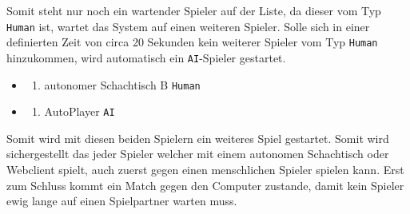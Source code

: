 Somit steht nur noch ein wartender Spieler auf der Liste, da dieser vom
Typ \passthrough{\lstinline!Human!} ist, wartet das System auf einen
weiteren Spieler. Solle sich in einer definierten Zeit von circa 20
Sekunden kein weiterer Spieler vom Typ \passthrough{\lstinline!Human!}
hinzukommen, wird automatisch ein \passthrough{\lstinline!AI!}-Spieler
gestartet.

\begin{itemize}
\item
  \begin{enumerate}
  \def\labelenumi{\arabic{enumi}.}
  \tightlist
  \item
    autonomer Schachtisch B \passthrough{\lstinline!Human!}
  \end{enumerate}
\item
  \begin{enumerate}
  \def\labelenumi{\arabic{enumi}.}
  \setcounter{enumi}{1}
  \tightlist
  \item
    AutoPlayer \passthrough{\lstinline!AI!}
  \end{enumerate}
\end{itemize}

Somit wird mit diesen beiden Spielern ein weiteres Spiel gestartet.
Somit wird sichergestellt das jeder Spieler welcher mit einem autonomen
Schachtisch oder Webclient spielt, auch zuerst gegen einen menschlichen
Spieler spielen kann. Erst zum Schluss kommt ein Match gegen den
Computer zustande, damit kein Spieler ewig lange auf einen Spielpartner
warten muss.

